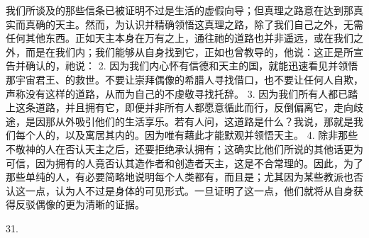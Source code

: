 我们所谈及的那些信条已被证明不过是生活的虚假向导；但真理之路意在达到那真实而真确的天主。然而，为认识并精确领悟这真理之路，除了我们自己之外，无需任何其他东西。正如天主本身在万有之上，通往祂的道路也并非遥远，或在我们之外，而是在我们内；我们能够从自身找到它，正如也曾教导的，他说：这正是所宣告并确认的，祂说： 2. 因为我们内心怀有信德和天主的国，就能迅速看见并领悟那宇宙君王、的救世。不要让崇拜偶像的希腊人寻找借口，也不要让任何人自欺，声称没有这样的道路，从而为自己的不虔敬寻找托辞。 3. 因为我们所有人都已踏上这条道路，并且拥有它，即便并非所有人都愿意循此而行，反倒偏离它，走向歧途，是因那从外吸引他们的生活享乐。若有人问，这道路是什么？我说，那就是我们每个人的，以及寓居其内的。因为唯有藉此才能默观并领悟天主。 4. 除非那些不敬神的人在否认天主之后，还要拒绝承认拥有；这确实比他们所说的其他话更为可信，因为拥有的人竟否认其造作者和创造者天主，这是不合常理的。因此，为了那些单纯的人，有必要简略地说明每个人类都有，而且是；尤其因为某些教派也否认这一点，认为人不过是身体的可见形式。一旦证明了这一点，他们就将从自身获得反驳偶像的更为清晰的证据。\par

31. \par


